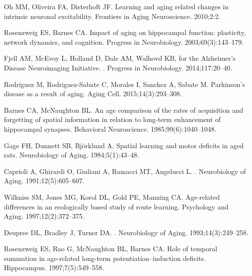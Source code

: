 \documentclass[10pt,letterpaper]{article}
\begin{document}
%

\begin{thebibliography}{100}

Oh MM, Oliveira FA, Disterhoft JF.
\newblock Learning and aging related changes in intrinsic neuronal excitability.
\newblock Frontiers in Aging Neuroscience. 2010;2:2.

Rosenzweig ES, Barnes CA.
\newblock Impact of aging on hippocampal function: plasticity, network dynamics, and cognition.
\newblock Progress in Neurobiology. 2003;69(3):143--179.

Fjell AM, McEvoy L, Holland D, Dale AM, Walhovd KB, {for the Alzheimer's Disease Neuroimaging Initiative}.
.
\newblock Progress in Neurobiology. 2014;117:20--40.

Rodriguez M, Rodriguez-Sabate C, Morales I, Sanchez A, Sabate M.
\newblock Parkinson's disease as a result of aging.
\newblock Aging Cell. 2015;14(3):293--308.

Barnes CA, McNaughton BL.
\newblock An age comparison of the rates of acquisition and forgetting of spatial information in relation to long-term enhancement of hippocampal synapses.
\newblock Behavioral Neuroscience. 1985;99(6):1040--1048.

Gage FH, Dunnett SB, Bj{\"o}rklund A.
\newblock Spatial learning and motor deficits in aged rats.
\newblock Neurobiology of Aging. 1984;5(1):43--48.

Caprioli A, Ghirardi O, Giuliani A, Ramacci MT, Angelucci L.
.
\newblock Neurobiology of Aging. 1991;12(5):605--607.

Wilkniss SM, Jones MG, Korol DL, Gold PE, Manning CA.
\newblock Age-related differences in an ecologically based study of route learning.
\newblock Psychology and Aging. 1997;12(2):372--375.

Deupree DL, Bradley J, Turner DA.
.
\newblock Neurobiology of Aging. 1993;14(3):249--258.

Rosenzweig ES, Rao G, McNaughton BL, Barnes CA.
\newblock Role of temporal summation in age-related long-term potentiation--induction deficits.
\newblock Hippocampus. 1997;7(5):549--558.


\end{thebibliography}
\end{document}
